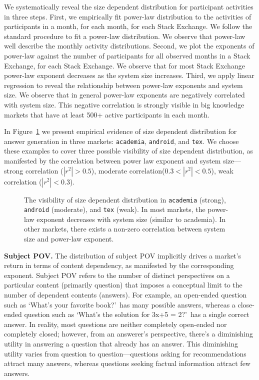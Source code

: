 We systematically reveal the size dependent distribution for participant activities in three steps. First, we empirically fit power-law distribution to the activities of participants in a month, for each month, for each Stack Exchange. We follow the standard procedure to fit a power-law distribution. We observe that power-law well describe the monthly activity distributions. Second, we plot the exponents of power-law against the number of participants for all observed months in a Stack Exchange, for each Stack Exchange. We observe that for most Stack Exchange power-law exponent decreases as the system size increases. Third, we apply linear regression to reveal the relationship between power-law exponents and system size. We observe that in general power-law exponents are negatively correlated with system size. This negative correlation is strongly visible in big knowledge markets that have at least 500+ active participants in each month.

In Figure~\ref{fig:sdd} we present empirical evidence of size dependent distribution for answer generation in three markets: \texttt{academia}, \texttt{android}, and \texttt{tex}. We choose these examples to cover three possible visibility of size dependent distribution, as manifested by the correlation between 
power law exponent and system size---strong correlation ($|r^2|>0.5$), moderate correlation($0.3<|r^2|<0.5$), weak correlation ($|r^2|<0.3$).  

\begin{figure}[hbt]
\centering
\caption{The visibility of size dependent distribution in \texttt{academia} (strong), \texttt{android} (moderate), and \texttt{tex} (weak). In most markets, the power-law exponent decreases with system size (similar to academia). In other markets, there exists a non-zero correlation between system size and power-law exponent.}
\label{fig:sdd}
\end{figure}

\textbf{Subject POV.} The distribution of subject POV implicitly drives a market's return in terms of content dependency, as manifested by the corresponding exponent. Subject POV refers to the number of distinct perspectives on a particular content (primarily question) that imposes a conceptual limit to the number of dependent contents (answers). For example, an open-ended question such as \lq What's your favorite book?\rq\ has many possible answers, whereas a close-ended question such as \lq What's the solution for 3x+5 = 2?\rq\ has a single correct answer. In reality, most questions are neither completely open-ended nor completely closed; however, from an answerer's perspective, there's a diminishing utility in answering a question that already has an answer. This diminishing utility varies from question to question---questions asking for recommendations attract many answers, whereas questions seeking factual information attract few answers. 

